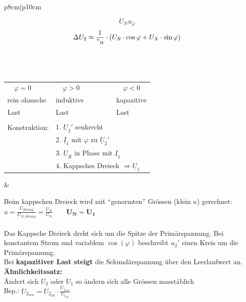\begin{tabular}{p{8cm}|p{10cm}}
\begin{minipage}{10cm}
\begin{minipage}{7.5cm}
$$		      			U_N u_\varphi $$
		      			$$ \Delta U_2 \approx \frac{1}{"u} \cdot (U_R \cdot \cos \varphi + U_X \cdot \sin \varphi)$$\\
		      		\end{minipage}         
                \end{minipage}\\
				\begin{minipage}{8cm}
 					\begin{tabular}[c]{p{2.66cm}p{2.66cm}p{2.66cm}}
                     	$\quad \varphi = 0$ & $\quad\varphi > 0$ & $\quad\varphi
                     	< 0$\\ rein ohmsche & induktive & kapazitive\\
                     	Last & Last & Last\\
                     	&&\\
                     	Konstruktion: & 1. $\underline{U}_2'$ senkrecht&\\
                     	& 2. $\underline{I}_1$ mit $\varphi$ zu $\underline{U}_2'$\\
                     	& \multicolumn{2}{l}{3. $\underline{U}_R$ in Phase mit $\underline{I}_1$ }\\
                     	& \multicolumn{2}{l}{4. Kappsches Dreieck $\Rightarrow \underline{U}_1$}
                     \end{tabular}               
                \end{minipage}& \hspace{0.2cm}
				\begin{minipage}{10cm}
		      		Beim kappschen Dreieck wird mit ``genormten'' Gr\"ossen (klein $u$) gerechnet: 
		      		$u = \frac{U_{Strang}}{U_{N, Strang}} = \frac{U_X}{U_N} \qquad
		      		\boldsymbol{U_N = U_1} $\\ \\ Das Kappsche Dreieck dreht sich um die
		      		Spitze der Prim\"arspannung. Bei konstantem Strom und variablem $\cos(\varphi)$ beschreibt ${u}_2'$
		      		einen
		      		Kreis um die Prim\"arspannung.\\ Bei \textbf{kapazitiver Last steigt}
		      		die Sekund\"arspannung über den Leerlaufwert an. \\ 
		      		\textbf{Ähnlichkeitssatz:}\\
		      		\"Andert sich $U_2$ oder $U_1$ so ändern sich alle Gr\"ossen masst\"ablich\\
		      		Bsp.: $\boxed{U_{2_{neu}} = U_{2_{alt}} \cdot \frac{U_{1_{neu}}}{U_{1_{alt}}}}$ \\              
                \end{minipage}     
            \end{tabular}

